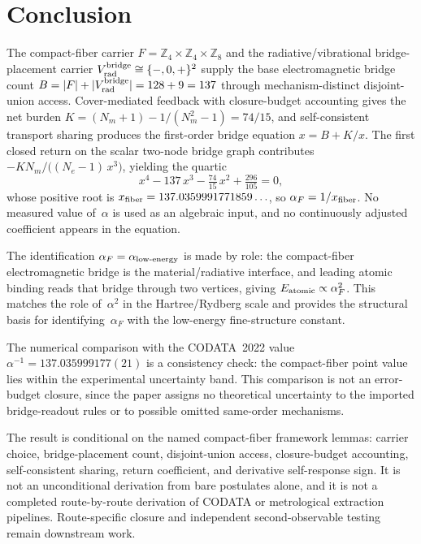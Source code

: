 \section{Conclusion}

The compact-fiber carrier $F = \mathbb{Z}_4 \times \mathbb{Z}_4
\times \mathbb{Z}_8$ and the radiative/vibrational
bridge-placement carrier $V_{\rm rad}^{\rm bridge} \cong
\{-,0,+\}^2$ supply the base electromagnetic bridge count
$B = |F| + |V_{\rm rad}^{\rm bridge}| = 128 + 9 = 137$ through
mechanism-distinct disjoint-union access.  Cover-mediated
feedback with closure-budget accounting gives the net burden
$K = (N_m{+}1) - 1/(N_m^2{-}1) = 74/15$, and self-consistent
transport sharing produces the first-order bridge equation
$x = B + K/x$.  The first closed return on the scalar two-node
bridge graph contributes
$-K N_m/\bigl((N_e{-}1)\,x^3\bigr)$, yielding the quartic
\[
  x^4 - 137\,x^3 - \tfrac{74}{15}\,x^2
  + \tfrac{296}{105} = 0,
\]
whose positive root is
$x_{\rm fiber} = 137.0359991771859\ldots$, so
$\alpha_F = 1/x_{\rm fiber}$.  No measured value of~$\alpha$
is used as an algebraic input, and no continuously adjusted
coefficient appears in the equation.

The identification $\alpha_F = \alpha_{\rm low\text{-}energy}$
is made by role: the compact-fiber electromagnetic bridge is the
material/radiative interface, and leading atomic binding reads
that bridge through two vertices, giving
$E_{\rm atomic} \propto \alpha_F^2$.  This matches the role
of~$\alpha^2$ in the Hartree/Rydberg scale and provides the
structural basis for identifying~$\alpha_F$ with the low-energy
fine-structure constant.

The numerical comparison with the CODATA~2022 value
$\alpha^{-1} = 137.035999177(21)$ is a consistency check: the
compact-fiber point value lies within the experimental
uncertainty band.  This comparison is not an error-budget
closure, since the paper assigns no theoretical uncertainty
to the imported bridge-readout rules or to possible omitted
same-order mechanisms.

The result is conditional on the named compact-fiber framework
lemmas: carrier choice, bridge-placement count, disjoint-union
access, closure-budget accounting, self-consistent sharing,
return coefficient, and derivative self-response sign.  It is
not an unconditional derivation from bare postulates alone, and
it is not a completed route-by-route derivation of CODATA or
metrological extraction pipelines.  Route-specific closure and
independent second-observable testing remain downstream work.